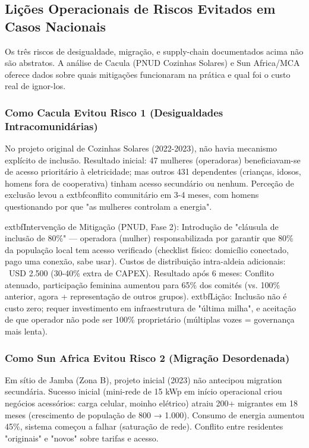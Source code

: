 \documentclass[12pt, a4paper]{article}
\begin{document}
{{{{{{{{{{{{\subsection{Lições Operacionais de Riscos Evitados em Casos Nacionais}

Os três riscos de desigualdade, migração, e supply-chain documentados acima não são abstratos. A análise de Cacula (PNUD Cozinhas Solares) e Sun Africa/MCA oferece dados sobre quais mitigações funcionaram na prática e qual foi o custo real de ignor-los.

\subsubsection*{Como Cacula Evitou Risco 1 (Desigualdades Intracomunidárias)}

No projeto original de Cozinhas Solares (2022-2023), não havia mecanismo explícito de inclusão. Resultado inicial: 47 mulheres (operadoras) beneficiavam-se de acesso prioritário à eletricidade; mas outros 431 dependentes (crianças, idosos, homens fora de cooperativa) tinham acesso secundário ou nenhum. Perceção de exclusão levou a 	extbf{conflito comunitário em 3-4 meses}, com homens questionando por que "as mulheres controlam a energia".

	extbf{Intervenção de Mitigação (PNUD, Fase 2)}: Introdução de "cláusula de inclusão de 80\%" — operadora (mulher) responsabilizada por garantir que 80\% da população local tem acesso verificado (checklist físico: domicílio conectado, pago uma conexão, sabe usar). Custos de distribuição intra-aldeia adicionais: ~USD 2.500 (30-40\% extra de CAPEX). Resultado após 6 meses: Conflito atenuado, participação feminina aumentou para 65\% dos comités (vs. 100\% anterior, agora + representação de outros grupos). 	extbf{Lição}: Inclusão não é custo zero; requer investimento em infraestrutura de "última milha", e aceitação de que operador não pode ser 100\% proprietário (múltiplas vozes = governança mais lenta).

\subsubsection*{Como Sun Africa Evitou Risco 2 (Migração Desordenada)}

Em sítio de Jamba (Zona B), projeto inicial (2023) não antecipou migration secundária. Sucesso inicial (mini-rede de 15 kWp em início operacional criou negócios acessórios: carga celular, moinho elétrico) atraiu 200+ migrantes em 18 meses (crescimento de população de 800 → 1.000). Consumo de energia aumentou 45\%, sistema começou a falhar (saturação de rede). Conflito entre residentes "originais" e "novos" sobre tarifas e acesso.

}}}}}}}}}}}}
\end{document}
